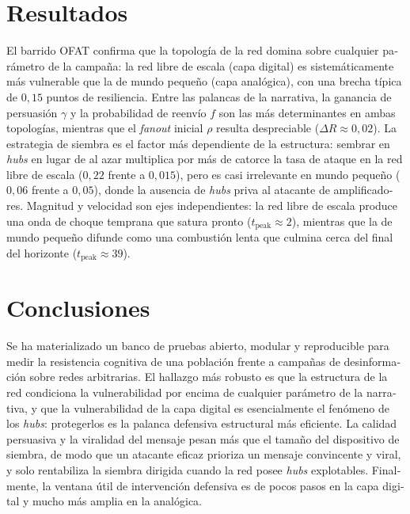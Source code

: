 \documentclass[12pt]{extarticle}
\numberwithin{equation}{section}
\newcommand{\sectionnotoc}[1]{%
    \refstepcounter{section}%
    \section*{\thesection\quad #1}%
}
\begin{document}
\begin{otherlanguage}{spanish}
\sectionnotoc{Resultados}

El barrido OFAT confirma que la topología de la red domina sobre cualquier parámetro de la campaña: la red libre de escala (capa digital) es sistemáticamente más vulnerable que la de mundo pequeño (capa analógica), con una brecha típica de $0{,}15$ puntos de resiliencia. Entre las palancas de la narrativa, la ganancia de persuasión $\gamma$ y la probabilidad de reenvío $f$ son las más determinantes en ambas topologías, mientras que el \emph{fanout} inicial $\rho$ resulta despreciable ($\Delta R \approx 0{,}02$). La estrategia de siembra es el factor más dependiente de la estructura: sembrar en \emph{hubs} en lugar de al azar multiplica por más de catorce la tasa de ataque en la red libre de escala ($0{,}22$ frente a $0{,}015$), pero es casi irrelevante en mundo pequeño ($0{,}06$ frente a $0{,}05$), donde la ausencia de \emph{hubs} priva al atacante de amplificadores. Magnitud y velocidad son ejes independientes: la red libre de escala produce una onda de choque temprana que satura pronto ($t_{\text{peak}}\approx 2$), mientras que la de mundo pequeño difunde como una combustión lenta que culmina cerca del final del horizonte ($t_{\text{peak}}\approx 39$).

\sectionnotoc{Conclusiones}

Se ha materializado un banco de pruebas abierto, modular y reproducible para medir la resistencia cognitiva de una población frente a campañas de desinformación sobre redes arbitrarias. El hallazgo más robusto es que la estructura de la red condiciona la vulnerabilidad por encima de cualquier parámetro de la narrativa, y que la vulnerabilidad de la capa digital es esencialmente el fenómeno de los \emph{hubs}: protegerlos es la palanca defensiva estructural más eficiente. La calidad persuasiva y la viralidad del mensaje pesan más que el tamaño del dispositivo de siembra, de modo que un atacante eficaz prioriza un mensaje convincente y viral, y solo rentabiliza la siembra dirigida cuando la red posee \emph{hubs} explotables. Finalmente, la ventana útil de intervención defensiva es de pocos pasos en la capa digital y mucho más amplia en la analógica.

\end{otherlanguage}

\end{document}
